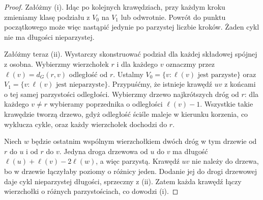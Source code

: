 \begin{proof}
Załóżmy (i). Idąc po kolejnych krawędziach, przy
każdym kroku zmieniamy klasę podziału z $V_0$ na
$V_1$ lub odwrotnie. Powrót do punktu początkowego
może więc nastąpić jedynie po parzystej liczbie
kroków. Żaden cykl nie ma długości nieparzystej.

Załóżmy teraz (ii). Wystarczy skonstruować podział
dla każdej składowej spójnej z osobna. Wybierzmy
wierzchołek $r$ i dla każdego $v$ oznaczmy przez
$\ell(v)=d_G(r,v)$ odległość od $r$. Ustalmy
$V_0=\{v:\ell(v)\text{ jest parzyste}\}$
oraz $V_1=\{v:\ell(v)\text{ jest nieparzyste}\}$.
Przypuśćmy, że istnieje krawędź $uv$ z końcami
o tej samej parzystości odległości. Wybierzmy
drzewo najkrótszych dróg od $r$: dla każdego
$v\ne r$ wybieramy poprzednika o odległości
$\ell(v)-1$. Wszystkie takie krawędzie tworzą
drzewo, gdyż odległość ściśle maleje w kierunku
korzenia, co wyklucza cykle, oraz każdy wierzchołek
dochodzi do $r$.

Niech $w$ będzie ostatnim wspólnym wierzchołkiem
dwóch dróg w tym drzewie od $r$ do $u$ i od $r$
do $v$. Jedyna droga drzewowa od $u$ do $v$
ma długość $\ell(u)+\ell(v)-2\ell(w)$, a więc
parzystą. Krawędź $uv$ nie należy do drzewa,
bo w drzewie łączyłaby poziomy o różnicy jeden.
Dodanie jej do drogi drzewowej daje cykl
nieparzystej długości, sprzeczny z (ii).
Zatem każda krawędź łączy wierzchołki o
różnych parzystościach, co dowodzi (i).
\end{proof}

\begin{center}
\end{center}


